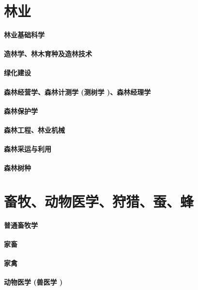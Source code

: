 \documentclass[UTF8]{../ApplicationUniverse}
\begin{document}
\chapter{林业}
\subsubsection{林业基础科学}
\subsubsection{造林学、林木育种及造林技术}
\subsubsection{绿化建设}
\subsubsection{森林经营学、森林计测学 (测树学 )、森林经理学}
\subsubsection{森林保护学}
\subsubsection{森林工程、林业机械}
\subsubsection{森林采运与利用}
\subsubsection{森林树种}



\chapter{畜牧、动物医学、狩猎、蚕、蜂}
\subsubsection{普通畜牧学}
\subsubsection{家畜}
\subsubsection{家禽}
\subsubsection{动物医学 (兽医学 )}
\end{document}
